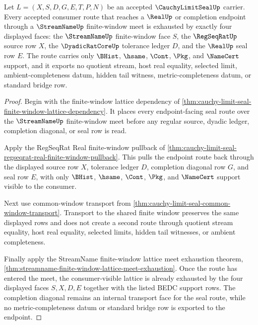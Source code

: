 \begin{theorem}
\label{thm:cauchy-limit-seal-finite-window-four-face-lattice-exhaustion}
Let $L=(X,S,D,G,E,T,P,N)$ be an accepted $\CauchyLimitSealUp$ carrier. Every accepted consumer route that reaches a $\RealUp$ or completion endpoint through a $\StreamNameUp$ finite-window meet is exhausted by exactly four displayed faces: the $\StreamNameUp$ finite-window face $S$, the $\RegSeqRatUp$ source row $X$, the $\DyadicRatCoreUp$ tolerance ledger $D$, and the $\RealUp$ seal row $E$. The route carries only $\BHist$, $\hsame$, $\Cont$, $\Pkg$, and $\NameCert$ support, and it exports no quotient stream, host real equality, selected limit, ambient-completeness datum, hidden tail witness, metric-completeness datum, or standard bridge row.
\end{theorem}
\begin{proof}
Begin with the finite-window lattice dependency of \autoref{thm:cauchy-limit-seal-finite-window-lattice-dependency}. It places every endpoint-facing seal route over the $\StreamNameUp$ finite-window meet before any regular source, dyadic ledger, completion diagonal, or seal row is read.

Apply the RegSeqRat Real finite-window pullback of \autoref{thm:cauchy-limit-seal-regseqrat-real-finite-window-pullback}. This pulls the endpoint route back through the displayed source row $X$, tolerance ledger $D$, completion diagonal row $G$, and seal row $E$, with only $\BHist$, $\hsame$, $\Cont$, $\Pkg$, and $\NameCert$ support visible to the consumer.

Next use common-window transport from \autoref{thm:cauchy-limit-seal-common-window-transport}. Transport to the shared finite window preserves the same displayed rows and does not create a second route through quotient stream equality, host real equality, selected limits, hidden tail witnesses, or ambient completeness.

Finally apply the StreamName finite-window lattice meet exhaustion theorem, \autoref{thm:streamname-finite-window-lattice-meet-exhaustion}. Once the route has entered the meet, the consumer-visible lattice is already exhausted by the four displayed faces $S,X,D,E$ together with the listed BEDC support rows. The completion diagonal remains an internal transport face for the seal route, while no metric-completeness datum or standard bridge row is exported to the endpoint.
\end{proof}

